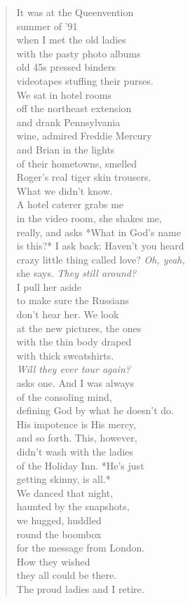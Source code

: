 \documentclass[
]{memoir}
\begin{document}
\begin{verse}
It was at the Queenvention\\
summer of ’91\\
when I met the old ladies\\
with the pasty photo albums\\
old 45s pressed binders\\
videotapes stuffing their purses.\\
We sat in hotel rooms\\
off the northeast extension\\
and drank Pennsylvania\\
wine, admired Freddie Mercury\\
and Brian in the lights\\
of their hometowns, smelled\\
Roger’s real tiger skin trousers.\\
What we didn’t know.\\
A hotel caterer grabs me\\
in the video room, she shakes me,\\
really, and asks *What in God’s name\\
is this?* I ask back: Haven’t you heard\\
crazy little thing called love? \emph{Oh, yeah,}\\
she says. \emph{They still around?}\\
I pull her aside\\
to make sure the Russians\\
don’t hear her. We look\\
at the new pictures, the ones\\
with the thin body draped\\
with thick sweatshirts.\\
\emph{Will they ever tour again?}\\
asks one. And I was always\\
of the consoling mind,\\
defining God by what he doesn’t do.\\
His impotence is His mercy,\\
and so forth. This, however,\\
didn’t wash with the ladies\\
of the Holiday Inn. *He’s just\\
getting skinny, is all.*\\
We danced that night,\\
haunted by the snapshots,\\
we hugged, huddled\\
round the boombox\\
for the message from London.\\
How they wished\\
they all could be there.\\
The proud ladies and I retire.\\
\end{verse}
\end{document}
